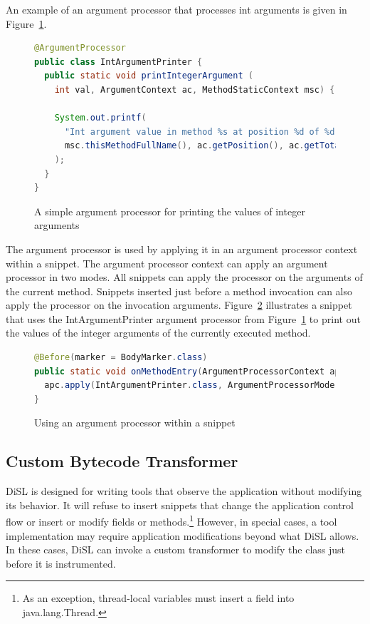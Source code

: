 \documentclass{article}
\newcommand{\brcode}[1]{\textsf{#1}}
\newcommand{\code}[1]{\mbox{\brcode{#1}}}
\begin{document}
An example of an argument processor that processes int arguments is given in Figure~\ref{fig:instr-argproc}.

\begin{figure}[h!]
\smaller
\begin{lstlisting}[language=Java]
@ArgumentProcessor
public class IntArgumentPrinter {
  public static void printIntegerArgument (
    int val, ArgumentContext ac, MethodStaticContext msc) {

    System.out.printf(
      "Int argument value in method %s at position %d of %d is %d\n",
      msc.thisMethodFullName(), ac.getPosition(), ac.getTotalCount(), val
    );
  }
}
\end{lstlisting}
\caption{A simple argument processor for printing the values of integer arguments}
\label{fig:instr-argproc}
\end{figure}

The argument processor is used by applying it in an argument processor context within a snippet.
The argument processor context can apply an argument processor in two modes.
All snippets can apply the processor on the arguments of the current method.
Snippets inserted just before a method invocation can also apply the processor on the invocation arguments.
Figure~\ref{fig:instr-argprocapply} illustrates a snippet that uses the \code{IntArgumentPrinter} argument processor from Figure~\ref{fig:instr-argproc} to print out the values of the integer arguments of the currently executed method.

\begin{figure}[h!]
\smaller
\begin{lstlisting}[language=Java]
@Before(marker = BodyMarker.class)
public static void onMethodEntry(ArgumentProcessorContext apc) {
  apc.apply(IntArgumentPrinter.class, ArgumentProcessorMode.METHOD_ARGS);
}
\end{lstlisting}
\caption{Using an argument processor within a snippet}
\label{fig:instr-argprocapply}
\end{figure}


\subsection{Custom Bytecode Transformer}

DiSL is designed for writing tools that observe the application without modifying its behavior.
It will refuse to insert snippets that change the application control flow or insert or modify fields or methods.\footnote{As an exception, thread-local variables must insert a field into \code{java.lang.Thread}.}
However, in special cases, a tool implementation may require application modifications beyond what DiSL allows.
In these cases, DiSL can invoke a custom transformer to modify the class just before it is instrumented.
\end{document}
